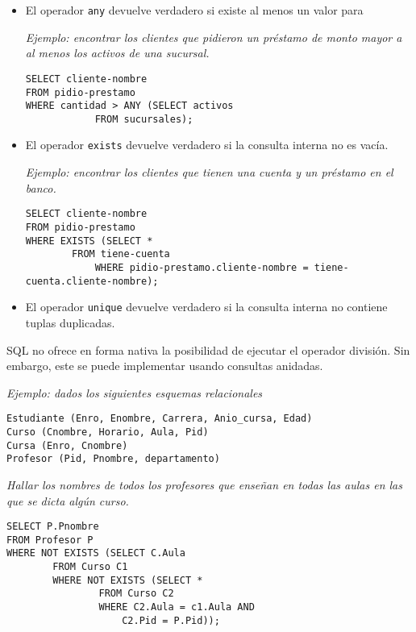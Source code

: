 \documentclass[a4paper, twoside]{article}
\begin{document}
\begin{itemize}
	\item El operador \texttt{any} devuelve verdadero si existe al menos un valor para

	\emph{Ejemplo: encontrar los clientes que pidieron un préstamo de monto mayor a al menos los activos de una sucursal.}

	\begin{lstlisting}
SELECT cliente-nombre
FROM pidio-prestamo
WHERE cantidad > ANY (SELECT activos
			FROM sucursales);
	\end{lstlisting}

	\item El operador \texttt{exists} devuelve verdadero si la consulta interna no es vacía.

	\emph{Ejemplo: encontrar los clientes que tienen una cuenta y un préstamo en el banco.}

	\begin{lstlisting}
SELECT cliente-nombre
FROM pidio-prestamo
WHERE EXISTS (SELECT *
		FROM tiene-cuenta
            WHERE pidio-prestamo.cliente-nombre = tiene-cuenta.cliente-nombre);
	\end{lstlisting}

	\item El operador \texttt{unique} devuelve verdadero si la consulta interna no contiene tuplas duplicadas.
\end{itemize}

SQL no ofrece en forma nativa la posibilidad de ejecutar el operador división. Sin embargo, este se puede implementar usando consultas anidadas.

\emph{Ejemplo: dados los siguientes esquemas relacionales}

\begin{lstlisting}
Estudiante (Enro, Enombre, Carrera, Anio_cursa, Edad) 
Curso (Cnombre, Horario, Aula, Pid) 
Cursa (Enro, Cnombre) 
Profesor (Pid, Pnombre, departamento) 
\end{lstlisting}

\emph{Hallar los nombres de todos los profesores que enseñan en todas las aulas en las que se dicta algún curso.}

\begin{lstlisting}
SELECT P.Pnombre 
FROM Profesor P 
WHERE NOT EXISTS (SELECT C.Aula                   
		FROM Curso C1                  
		WHERE NOT EXISTS (SELECT *                                    
				FROM Curso C2                                    
				WHERE C2.Aula = c1.Aula AND      
					C2.Pid = P.Pid));
\end{lstlisting}
\end{document}
